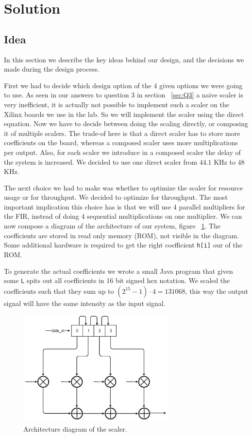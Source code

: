 \section{Solution}
\subsection{Idea}
In this section we describe the key ideas behind our design, and the decisions we made during the design process.

First we had to decide which design option of the 4 given options we were going to use. As seen in our answers to question 3 in section ~\ref{sec:Q3} a naive scaler is very inefficient, it is actually not possible to implement such a scaler on the Xilinx boards we use in the lab. So we will implement the scaler using the direct equation. Now we have to decide between doing the scaling directly, or composing it of multiple scalers. The trade-of here is that a direct scaler has to store more coefficients on the board, whereas a composed scaler uses more multiplications per output. Also, for each scaler we introduce in a composed scaler the delay of the system is increased. We decided to use one direct scaler from $44.1$ KHz to $48$ KHz.

The next choice we had to make was whether to optimize the scaler for resource usage or for throughput. We decided to optimize for throughput. The most important implication this choice has is that we will use 4 parallel multipliers for the FIR, instead of doing 4 sequential multiplications on one multiplier. We can now compose a diagram of the architecture of our system, figure ~\ref{fig:arch}. The coefficients are stored in read only memory (ROM), not visible in the diagram. Some additional hardware is required to get the right coefficient \texttt{h[i]} our of the ROM.

To generate the actual coefficients we wrote a small Java program that given some \texttt{L} spits out all coefficients  in 16 bit signed hex notation. We scaled the coefficients such that they sum up to $(2^{15}-1)\cdot 4 = 131068$, this way the output signal will have the same intensity as the input signal.

\begin{figure}
\begin{center}
\includegraphics[width=0.7\textwidth]{images/architecture.png}
\caption{Architecture diagram of the scaler.}
\label{fig:arch}
\end{center}
\end{figure}

